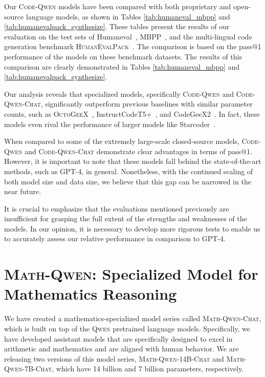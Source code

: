 Our \textsc{Code-Qwen} models have been compared with both proprietary and open-source language models, as shown in Tables \ref{tab:humaneval_mbpp} and \ref{tab:humanevalpack_synthesize}. These tables present the results of our evaluation on the test sets of Humaneval~\citep{codex}, MBPP~\citep{mbpp}, and the multi-lingual code generation benchmark \textsc{HumanEvalPack}~\citep{octopack}. The comparison is based on the pass@1 performance of the models on these benchmark datasets. The results of this comparison are clearly demonstrated in Tables \ref{tab:humaneval_mbpp} and \ref{tab:humanevalpack_synthesize}.

Our analysis reveals that specialized models, specifically \textsc{Code-Qwen} and \textsc{Code-Qwen-Chat}, significantly outperform previous baselines with similar parameter counts, such as \textsc{OctoGeeX}~\citep{octopack}, InstructCodeT5+~\citep{CodeT5+}, and CodeGeeX2~\citep{CodeGeeX}. In fact, these models even rival the performance of larger models like Starcoder~\citep{starcoder}.

When compared to some of the extremely large-scale closed-source models, \textsc{Code-Qwen} and \textsc{Code-Qwen-Chat} demonstrate clear advantages in terms of pass@1. However, it is important to note that these models fall behind the state-of-the-art methods, such as GPT-4, in general. Nonetheless, with the continued scaling of both model size and data size, we believe that this gap can be narrowed in the near future.

It is crucial to emphasize that the evaluations mentioned previously are insufficient for grasping the full extent of the strengths and weaknesses of the models. In our opinion, it is necessary to develop more rigorous tests to enable us to accurately assess our relative performance in comparison to GPT-4.

\section{\textsc{Math-Qwen}: Specialized Model for Mathematics Reasoning}

\label{sec:math}

We have created a mathematics-specialized model series called \textsc{Math-Qwen-Chat}, which is built on top of the \textsc{Qwen} pretrained language models. Specifically, we have developed assistant models that are specifically designed to excel in arithmetic and mathematics and are aligned with human behavior. We are releasing two versions of this model series, \textsc{Math-Qwen-14B-Chat} and \textsc{Math-Qwen-7B-Chat}, which have \num{14} billion and \num{7} billion parameters, respectively.

